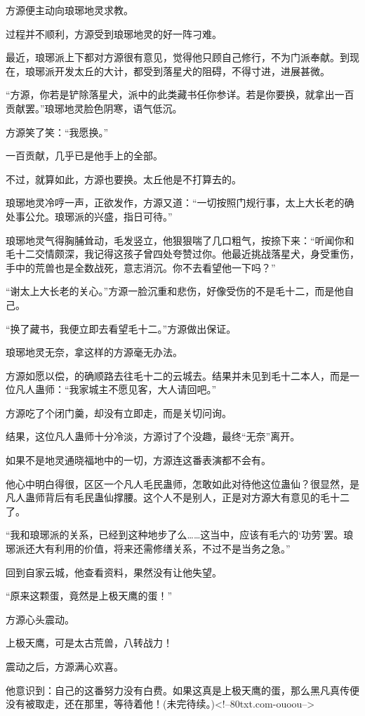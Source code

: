 \begin{this_body}
方源便主动向琅琊地灵求教。

过程并不顺利，方源受到琅琊地灵的好一阵刁难。

最近，琅琊派上下都对方源很有意见，觉得他只顾自己修行，不为门派奉献。到现在，琅琊派开发太丘的大计，都受到落星犬的阻碍，不得寸进，进展甚微。

“方源，你若是铲除落星犬，派中的此类藏书任你参详。若是你要换，就拿出一百贡献罢。”琅琊地灵脸色阴寒，语气低沉。

方源笑了笑：“我愿换。”

一百贡献，几乎已是他手上的全部。

不过，就算如此，方源也要换。太丘他是不打算去的。

琅琊地灵冷哼一声，正欲发作，方源又道：“一切按照门规行事，太上大长老的确处事公允。琅琊派的兴盛，指日可待。”

琅琊地灵气得胸脯耸动，毛发竖立，他狠狠喘了几口粗气，按捺下来：“听闻你和毛十二交情颇深，我记得这孩子曾四处夸赞过你。他最近挑战落星犬，身受重伤，手中的荒兽也是全数战死，意志消沉。你不去看望他一下吗？”

“谢太上大长老的关心。”方源一脸沉重和悲伤，好像受伤的不是毛十二，而是他自己。

“换了藏书，我便立即去看望毛十二。”方源做出保证。

琅琊地灵无奈，拿这样的方源毫无办法。

方源如愿以偿，的确顺路去往毛十二的云城去。结果并未见到毛十二本人，而是一位凡人蛊师：“我家城主不愿见客，大人请回吧。”

方源吃了个闭门羹，却没有立即走，而是关切问询。

结果，这位凡人蛊师十分冷淡，方源讨了个没趣，最终“无奈”离开。

如果不是地灵通晓福地中的一切，方源连这番表演都不会有。

他心中明白得很，区区一个凡人毛民蛊师，怎敢如此对待他这位蛊仙？很显然，是凡人蛊师背后有毛民蛊仙撑腰。这个人不是别人，正是对方源大有意见的毛十二了。

“我和琅琊派的关系，已经到这种地步了么……这当中，应该有毛六的‘功劳’罢。琅琊派还大有利用的价值，将来还需修缮关系，不过不是当务之急。”

回到自家云城，他查看资料，果然没有让他失望。

“原来这颗蛋，竟然是上极天鹰的蛋！”

方源心头震动。

上极天鹰，可是太古荒兽，八转战力！

震动之后，方源满心欢喜。

他意识到：自己的这番努力没有白费。如果这真是上极天鹰的蛋，那么黑凡真传便没有被取走，还在那里，等待着他！(未完待续。)<!--80txt.com-ouoou-->

\end{this_body}

